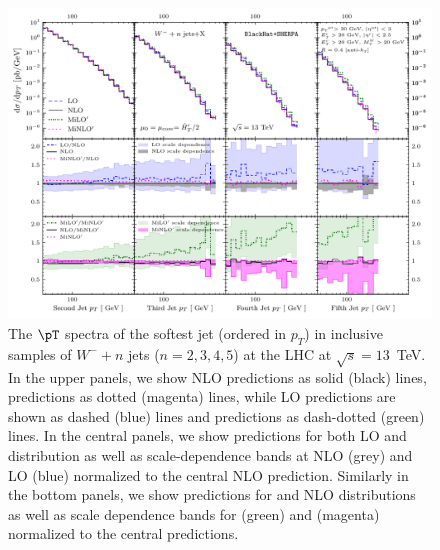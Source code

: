 \begin{figure}[t]

\includegraphics[clip,scale=0.95]{plots/Wmnj-13TeV_anti-kt-R4-Pt30_jets_jet_1_1_pt__Kn}
\caption{The $\pT$ spectra of the softest jet (ordered in $p_T$) in inclusive
  samples of $W^-+n$ jets ($n=2,3,4,5$) at the LHC at $\sqrt{s}=13$~TeV. In the upper panels, we show NLO predictions as solid (black) lines, \MINLOp{} predictions as dotted
(magenta) lines, while LO predictions are shown as dashed (blue) lines
and \MILOp{} predictions as dash-dotted (green) lines. In the
central panels, we show predictions for both LO and \MINLOp{} distribution as
well as scale-dependence bands at NLO (grey) and LO (blue) normalized to the central NLO
prediction. Similarly in the bottom panels, we show predictions for \MILOp{} and NLO distributions as well
as scale dependence bands for
\MILOp{} (green) and
\MINLOp{} (magenta) normalized to the central \MINLOp{} predictions.}
\label{fig_Wmnjptv}
\end{figure}

